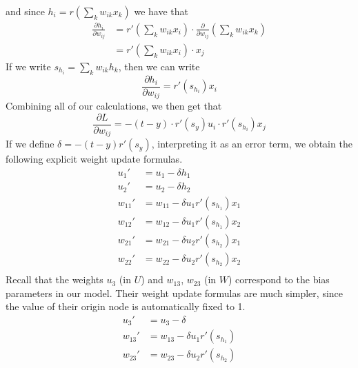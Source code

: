 \documentclass[12pt,letterpaper]{book}
\theoremstyle{definition}
\begin{document}
  and since $h_i = r\left( \sum_{k}w_{ik}x_k \right)$ we have that 
  \begin{align}
    \frac{\partial h_i}{\partial w_{ij}} 
    &= r'\left(\sum_{k}w_{ik}x_i\right) \cdot \frac{\partial }{\partial w_{ij}} \left( \sum_{k}w_{ik}x_k \right) \\
    &= r'\left(\sum_{k}w_{ik}x_i\right) \cdot x_j 
  \end{align}
  If we write $s_{h_i} = \sum_{k}w_{ik}h_k$, then we can write
  \[
    \frac{\partial h_i}{\partial w_{ij}} 
    = r'(s_{h_i})x_i
  \]
  Combining all of our calculations, we then get that 
  \[
    \frac{\partial L}{\partial w_{ij}}= -(t - y) \cdot r'(s_y)u_i \cdot r'(s_{h_i})x_j
  \]
  If we define $\delta = -(t - y)r'(s_y)$, interpreting it as an error term,
  we obtain the following explicit weight update formulas.
  \begin{align}
    u_1' &= u_1 - \delta h_1\\
    u_2' &= u_2 - \delta h_2\\
    w_{11}' &= w_{11} - \delta u_1r'(s_{h_1})x_1\\
    w_{12}' &= w_{12} - \delta u_1r'(s_{h_1})x_2\\
    w_{21}' &= w_{21} - \delta u_2r'(s_{h_2})x_1\\
    w_{22}' &= w_{22} - \delta u_2r'(s_{h_2})x_2\\
  \end{align}
  Recall that the weights $u_3$ (in $U$) and $w_{13}$, $w_{23}$ (in $W$) 
  correspond to the bias parameters in our model. Their weight update formulas are much simpler, 
  since the value of their origin node is automatically fixed to 1.
  \begin{align}
    u_3' &= u_3 - \delta \\
    w_{13}' &= w_{13} - \delta u_1r'(s_{h_1})\\
    w_{23}' &= w_{23} - \delta u_2r'(s_{h_2})\\
  \end{align}
\end{document}
